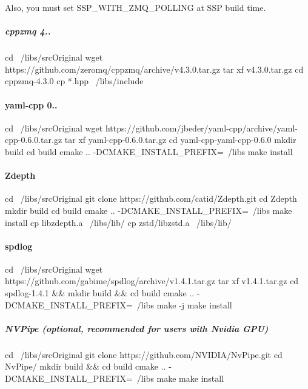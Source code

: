 Also, you must set S\+S\+P\+\_\+\+W\+I\+T\+H\+\_\+\+Z\+M\+Q\+\_\+\+P\+O\+L\+L\+I\+NG at S\+SP build time.

\subparagraph*{cppzmq 4..}


\begin{DoxyCode}
cd ~/libs/srcOriginal
wget https://github.com/zeromq/cppzmq/archive/v4.3.0.tar.gz
tar xf v4.3.0.tar.gz
cd cppzmq-4.3.0
cp *.hpp ~/libs/include
\end{DoxyCode}


\paragraph*{yaml-\/cpp 0..}


\begin{DoxyCode}
cd ~/libs/srcOriginal
wget https://github.com/jbeder/yaml-cpp/archive/yaml-cpp-0.6.0.tar.gz
tar xf yaml-cpp-0.6.0.tar.gz
cd yaml-cpp-yaml-cpp-0.6.0
mkdir build
cd build
cmake .. -DCMAKE\_INSTALL\_PREFIX=~/libs
make install
\end{DoxyCode}


\paragraph*{Zdepth}


\begin{DoxyCode}
cd ~/libs/srcOriginal
git clone https://github.com/catid/Zdepth.git
cd Zdepth
mkdir build
cd build
cmake .. -DCMAKE\_INSTALL\_PREFIX=~/libs
make install
cp libzdepth.a ~/libs/lib/
cp zstd/libzstd.a ~/libs/lib/
\end{DoxyCode}


\paragraph*{spdlog}


\begin{DoxyCode}
cd ~/libs/srcOriginal
wget https://github.com/gabime/spdlog/archive/v1.4.1.tar.gz
tar xf v1.4.1.tar.gz
cd spdlog-1.4.1 && mkdir build && cd build
cmake .. -DCMAKE\_INSTALL\_PREFIX=~/libs
make -j
make install
\end{DoxyCode}


\subparagraph*{N\+V\+Pipe (optional, recommended for users with Nvidia G\+PU)}


\begin{DoxyCode}
cd ~/libs/srcOriginal
git clone https://github.com/NVIDIA/NvPipe.git
cd NvPipe/
mkdir build && cd build
cmake .. -DCMAKE\_INSTALL\_PREFIX=~/libs
make
make install
\end{DoxyCode}


